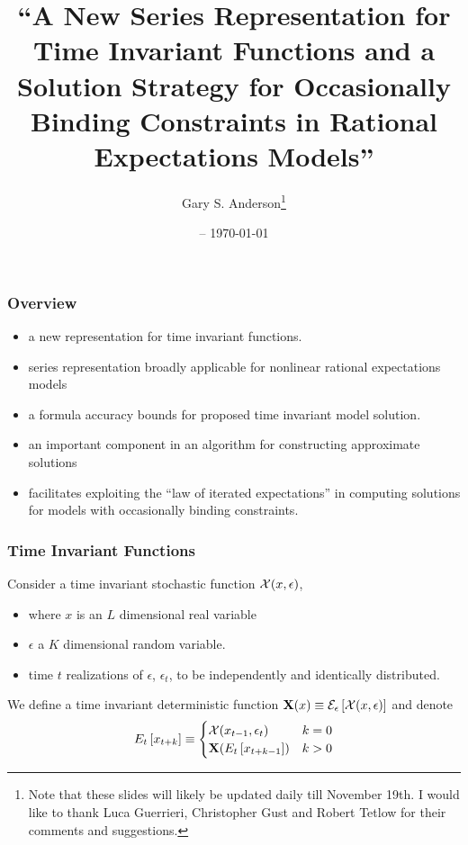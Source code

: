 \documentclass[letter]{beamer}
\title{``A New Series Representation for Time Invariant Functions and
a Solution Strategy for Occasionally Binding Constraints in Rational Expectations Models''}
\date{\currenttime -- \today }
\author{Gary S. Anderson\thanks{Note that these slides will likely be updated daily till November 19th. I would like to thank Luca Guerrieri, Christopher Gust and Robert Tetlow for their comments and suggestions. }}
\begin{document}
\begin{frame}
  \titlepage
\end{frame}

\begin{frame}
  \frametitle{Overview}
  \begin{itemize}
  \item  a new representation for time invariant functions.
  \item  series representation broadly applicable for nonlinear rational expectations models 
\item a formula  accuracy bounds for proposed time invariant model solution.
\item an important component in an algorithm for constructing approximate solutions 
\item facilitates exploiting the ``law of iterated expectations'' in computing solutions for models with occasionally binding constraints.
  \end{itemize}
\end{frame}

\begin{frame}
  \frametitle{Time Invariant Functions}

Consider a time invariant stochastic function $\mathcal{X}(x,\epsilon)$, 
\begin{itemize}
\item where $x$ is an $L$ dimensional real variable
\item $\epsilon$ a $K$ dimensional random variable.
\item time $t$ realizations of $\epsilon$, $\epsilon_t$, to be independently and identically distributed.
\end{itemize}
We define a time invariant deterministic function $\mathbf{X}(x)\equiv \mathcal{E}_{\epsilon} \left [\mathcal{X}(x,\epsilon) \right ]$ and denote
\begin{gather*}
E_{t} \left [x_{t+k} \right ]\equiv\begin{cases}
\mathcal{X}{(x_{t-1},\epsilon_t)} &k=0\\
\mathbf{X}{(E_{t} \left [x_{t+k-1} \right ])} &k>0
\end{cases}
\end{gather*}

\end{frame}
\end{document}
